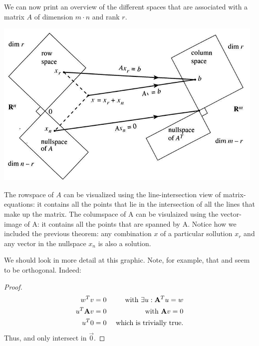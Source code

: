 We can now print an overview of the different spaces that are associated with a matrix $A$ of dimension $m \cdot n$ and rank $r$.

\includegraphics[width=0.7\linewidth]{images/four_spaces.png}

The rowspace of $A$ can be visualized using the line-intersection view of matrix-equations: it contains all the points that lie in the intersection of all the lines that make up the matrix. The columspace of A can be visulaized using the vector-image of A: it contains all the points that are spanned by A. 
Notice how we included the previous theorem: any combination $x$ of a particular sollution $x_r$ and any vector in the nullspace $x_n$ is also a solution.


We should look in more detail at this graphic. Note, for example, that  and  seem to be orthogonal. Indeed:
\begin{theorem}
\end{theorem}
\begin{proof}
    \begin{equation}
        \begin{aligned}
            w^T v &= 0  & \text{ with } \exists u: \mathbf{A}^T u = w \\
            u^T \mathbf{A} v &= 0 & \text{ with } \mathbf{A}v = 0 \\
            u^T 0 &= 0 & \text{ which is trivially true.}
        \end{aligned}
    \end{equation}
    Thus,  and  only intersect in $\vec{0}$.
\end{proof}

